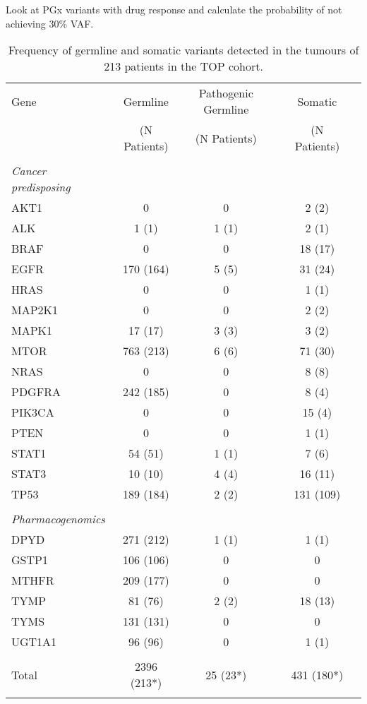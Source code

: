Look at PGx variants with drug response and calculate the probability of not achieving 30\% VAF.

\pagebreak

\begin{table}[H]
\caption{Frequency of germline and somatic variants detected in the tumours of 213 patients in the TOP cohort.}\label{freqvariants}
\centering
\begin{tabular}{lcclcl}
        \hline
        Gene & Germline & Pathogenic Germline && Somatic \\
				 & (N Patients) & (N Patients) && (N Patients) \\
				\hline
				\\
				\multicolumn{1}{l}{\textit{Cancer predisposing}}
				&
				\multicolumn{2}{l}{ }
				&&
				\multicolumn{1}{l}{} \\
				\hline
				AKT1 & 0 & 0 && 2 (2) \\
				\arrayrulecolor{evagrey}\hline
				ALK & 1 (1) & 1 (1) && 2 (1) \\
				\hline
				BRAF & 0 & 0 && 18 (17) \\
				\hline
				EGFR & 170 (164) & 5 (5) && 31 (24) \\
				\hline
				HRAS & 0 & 0 && 1 (1) \\
				\hline
				MAP2K1 & 0 & 0 && 2 (2) \\
				\hline
				MAPK1 & 17 (17) & 3 (3) && 3 (2) \\
				\hline
				MTOR & 763 (213) & 6 (6) && 71 (30) \\
				\hline
				NRAS & 0 & 0 && 8 (8) \\
				\hline
				PDGFRA & 242 (185) & 0 && 8 (4) \\
				\hline
				PIK3CA & 0 & 0 && 15 (4) \\
				\hline
				PTEN & 0 & 0 && 1 (1) \\
				\hline
				STAT1 & 54 (51) & 1 (1) && 7 (6) \\
				\hline
				STAT3 & 10 (10) & 4 (4) && 16 (11) \\
				\hline
				TP53 & 189 (184) & 2 (2) && 131 (109) \\
				\arrayrulecolor{black}\hline
				\\
				\multicolumn{1}{l}{\textit{Pharmacogenomics}}
				&
				\multicolumn{2}{l}{ }
				&&
				\multicolumn{1}{l}{} \\
				\arrayrulecolor{black}\hline
				DPYD & 271 (212) & 1 (1) && 1 (1) \\
				\arrayrulecolor{evagrey}\hline
				GSTP1 & 106 (106) & 0 && 0 \\
				\hline
				MTHFR & 209 (177) & 0 && 0 \\
				\hline
				TYMP & 81 (76) & 2 (2) && 18 (13)\\
				\hline
				TYMS & 131 (131) & 0 && 0 \\
				\hline
				UGT1A1 & 96 (96) & 0 && 1 (1) \\
				\arrayrulecolor{black}\hline \\
				Total & 2396 (213*) & 25 (23*) && 431 (180*) \\
				\arrayrulecolor{black}\hline
      \end{tabular}
\end{table}
